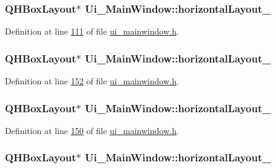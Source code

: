 \hypertarget{a00080_a9ab91d59aada4ff82309b36c9d5a0fa6}{
\subsubsection[{horizontal\+Layout\+\_\+16}]{\setlength{\rightskip}{0pt plus 5cm}Q\+H\+Box\+Layout$\ast$ Ui\+\_\+\+Main\+Window\+::horizontal\+Layout\+\_}}\label{a00080_a9ab91d59aada4ff82309b36c9d5a0fa6}


Definition at line \hyperlink{a00139_source_l00111}{111} of file \hyperlink{a00139_source}{ui\+\_\+mainwindow.\+h}.

\hypertarget{a00080_a8cfe172f7719cf363fc630c536cad6c3}{
\subsubsection[{horizontal\+Layout\+\_\+17}]{\setlength{\rightskip}{0pt plus 5cm}Q\+H\+Box\+Layout$\ast$ Ui\+\_\+\+Main\+Window\+::horizontal\+Layout\+\_}}\label{a00080_a8cfe172f7719cf363fc630c536cad6c3}


Definition at line \hyperlink{a00139_source_l00152}{152} of file \hyperlink{a00139_source}{ui\+\_\+mainwindow.\+h}.

\hypertarget{a00080_a49a16c34d46bb0d66edb10c3b92b226c}{
\subsubsection[{horizontal\+Layout\+\_\+18}]{\setlength{\rightskip}{0pt plus 5cm}Q\+H\+Box\+Layout$\ast$ Ui\+\_\+\+Main\+Window\+::horizontal\+Layout\+\_}}\label{a00080_a49a16c34d46bb0d66edb10c3b92b226c}


Definition at line \hyperlink{a00139_source_l00150}{150} of file \hyperlink{a00139_source}{ui\+\_\+mainwindow.\+h}.

\hypertarget{a00080_a5a19bc8cf16dd2fbfa87ddaec41e2d75}{
\subsubsection[{horizontal\+Layout\+\_\+19}]{\setlength{\rightskip}{0pt plus 5cm}Q\+H\+Box\+Layout$\ast$ Ui\+\_\+\+Main\+Window\+::horizontal\+Layout\+\_}}\label{a00080_a5a19bc8cf16dd2fbfa87ddaec41e2d75}


